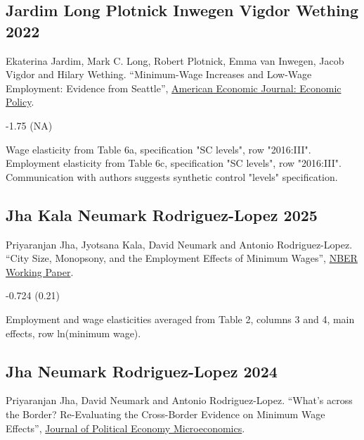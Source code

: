 \subsection*{Jardim Long Plotnick Inwegen Vigdor Wething 2022}
\vspace{-0.7em}

\noindent Ekaterina Jardim, Mark C. Long, Robert Plotnick, Emma van Inwegen, Jacob Vigdor and Hilary Wething. ``Minimum-Wage Increases and Low-Wage Employment: Evidence from Seattle'', \href{https://doi.org/10.1257/pol.20180578}{American Economic Journal: Economic Policy}.

\vspace{0.7em}

 -1.75 (NA)

\vspace{0.7em}

 Wage elasticity from Table 6a, specification "SC levels", row "2016:III". Employment elasticity from Table 6c, specification "SC levels", row "2016:III". Communication with authors suggests synthetic control "levels" specification.

\subsection*{Jha Kala Neumark Rodriguez-Lopez 2025}
\vspace{-0.7em}

\noindent Priyaranjan Jha, Jyotsana Kala, David Neumark and Antonio Rodriguez-Lopez. ``City Size, Monopsony, and the Employment Effects of Minimum Wages'', \href{https://www.nber.org/papers/w33862}{NBER Working Paper}.

\vspace{0.7em}

 -0.724 (0.21)

\vspace{0.7em}

 Employment and wage elasticities averaged from Table 2, columns 3 and 4, main effects, row ln(minimum wage).

\subsection*{Jha Neumark Rodriguez-Lopez 2024}
\vspace{-0.7em}

\noindent Priyaranjan Jha, David Neumark and Antonio Rodriguez-Lopez. ``What's across the Border? Re-Evaluating the Cross-Border Evidence on Minimum Wage Effects'', \href{https://sites.socsci.uci.edu/~jantonio/Papers/minwage_czones.pdf}{Journal of Political Economy Microeconomics}.


